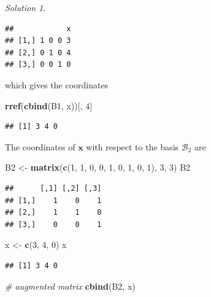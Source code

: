 \documentclass[
]{book}
\newenvironment{Shaded}{\begin{snugshade}}{\end{snugshade}}
\newcommand{\CommentTok}[1]{\textcolor[rgb]{0.56,0.35,0.01}{\textit{#1}}}
\newcommand{\DecValTok}[1]{\textcolor[rgb]{0.00,0.00,0.81}{#1}}
\newcommand{\KeywordTok}[1]{\textcolor[rgb]{0.13,0.29,0.53}{\textbf{#1}}}
\newcommand{\NormalTok}[1]{#1}
\newcommand{\StringTok}[1]{\textcolor[rgb]{0.31,0.60,0.02}{#1}}
\theoremstyle{definition}
\theoremstyle{definition}
\theoremstyle{definition}
\theoremstyle{definition}
\theoremstyle{remark}
\newtheorem*{solution}{Solution}
\begin{document}
\begin{solution}
\begin{verbatim}
##            x
## [1,] 1 0 0 3
## [2,] 0 1 0 4
## [3,] 0 0 1 0
\end{verbatim}

which gives the coordinates

\begin{Shaded}
\begin{Highlighting}[]
\KeywordTok{rref}\NormalTok{(}\KeywordTok{cbind}\NormalTok{(B1, x))[, }\DecValTok{4}\NormalTok{]}
\end{Highlighting}
\end{Shaded}

\begin{verbatim}
## [1] 3 4 0
\end{verbatim}

The coordinates of \(\mathbf{x}\) with respect to the basis \(\mathcal{B}_2\) are

\begin{Shaded}
\begin{Highlighting}[]
\NormalTok{B2 <-}\StringTok{ }\KeywordTok{matrix}\NormalTok{(}\KeywordTok{c}\NormalTok{(}\DecValTok{1}\NormalTok{, }\DecValTok{1}\NormalTok{, }\DecValTok{0}\NormalTok{, }\DecValTok{0}\NormalTok{, }\DecValTok{1}\NormalTok{, }\DecValTok{0}\NormalTok{, }\DecValTok{1}\NormalTok{, }\DecValTok{0}\NormalTok{, }\DecValTok{1}\NormalTok{), }\DecValTok{3}\NormalTok{, }\DecValTok{3}\NormalTok{)}
\NormalTok{B2}
\end{Highlighting}
\end{Shaded}

\begin{verbatim}
##      [,1] [,2] [,3]
## [1,]    1    0    1
## [2,]    1    1    0
## [3,]    0    0    1
\end{verbatim}

\begin{Shaded}
\begin{Highlighting}[]
\NormalTok{x <-}\StringTok{ }\KeywordTok{c}\NormalTok{(}\DecValTok{3}\NormalTok{, }\DecValTok{4}\NormalTok{, }\DecValTok{0}\NormalTok{)}
\NormalTok{x}
\end{Highlighting}
\end{Shaded}

\begin{verbatim}
## [1] 3 4 0
\end{verbatim}

\begin{Shaded}
\begin{Highlighting}[]
\CommentTok{# augmented matrix}
\KeywordTok{cbind}\NormalTok{(B2, x)}
\end{Highlighting}
\end{Shaded}


\end{solution}
\end{document}
